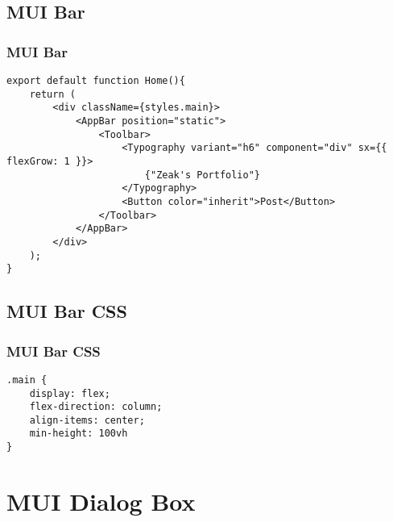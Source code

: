 \documentclass{beamer}
\begin{document}
\subsection{MUI Bar}
\begin{frame}[fragile]
\frametitle{MUI Bar}
\begin{lstlisting}
export default function Home(){
    return (
        <div className={styles.main}>
            <AppBar position="static">        
                <Toolbar>
                    <Typography variant="h6" component="div" sx={{ flexGrow: 1 }}>
                        {"Zeak's Portfolio"}
                    </Typography>
                    <Button color="inherit">Post</Button>
                </Toolbar>
            </AppBar>
        </div>
    );
}
\end{lstlisting}
\end{frame}

\subsection{MUI Bar CSS}
\begin{frame}[fragile]
\frametitle{MUI Bar CSS}
\begin{lstlisting}
.main {
    display: flex;
    flex-direction: column;
    align-items: center;
    min-height: 100vh
}
\end{lstlisting}
\end{frame}


\section{MUI Dialog Box}
\end{document}
